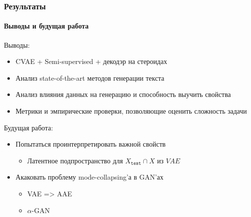 \documentclass[10pt]{beamer}
\newcommand{\X}[1]{X_{\texttt{#1}}}
\newcommand{\Xtest}{\X{test}}
\begin{document}
\begin{frame}
\frametitle{Результаты}
\framesubtitle{Выводы и будущая работа}

Выводы:
\begin{itemize}
    \item CVAE + Semi-supervised + декодэр на стероидах
    \item Анализ state-of-the-art методов генерации текста
    \item Анализ влияния данных на генерацию и способность выучить свойства
    \item Метрики и эмпирические проверки, позволяющие оценить сложность задачи
\end{itemize}

Будущая работа:
\begin{itemize}
    \item Попытаться проинтерпретировать важной свойств
    \begin{itemize}
        \item Латентное подпространство для $\Xtest \cap X$ из $VAE$
    \end{itemize}
    \item Акаковать проблему mode-collapsing'а в GAN'ах
    \begin{itemize}
        \item VAE => AAE
        \item $\alpha$-GAN
    \end{itemize}
\end{itemize}

\end{frame}
\end{document}
